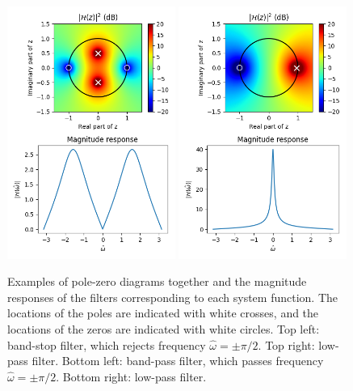 \begin{figure}
\begin{center}
\includegraphics[width=0.49\textwidth]{code/026_iir/ex3.png}
\includegraphics[width=0.49\textwidth]{code/026_iir/ex4.png}
\end{center}
\caption{Examples of pole-zero diagrams together and the magnitude responses of the filters corresponding to each system function. The locations of the poles are indicated with white crosses, and the locations of the zeros are indicated with white circles. Top left: band-stop filter, which rejects frequency $\hat{\omega}=\pm\pi/2$. Top right: low-pass filter. Bottom left: band-pass filter, which passes frequency $\hat{\omega}=\pm \pi/2$. Bottom right: low-pass filter.}
\label{fig:pz_examples}
\end{figure}

